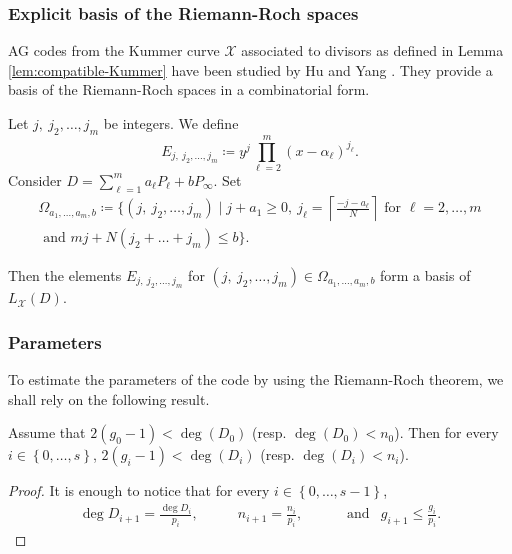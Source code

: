 \documentclass[10pt,a4paper]{article}
\newcommand\ceil[1]{\left\lceil #1 \right\rceil}
\newcommand{\set}[1]{\left\{#1\right\}}
\newcommand{\range}[1]{\set{0,\dots,#1-1}}
\newcommand{\Range}[2]{\set{#1,\dots,#2}}
\newcommand\calX{\mathcal{X}}
\newcommand\mydef{\coloneqq}
\theoremstyle{plain}
\theoremstyle{plain}
\theoremstyle{definition}
\theoremstyle{remark}
\theoremstyle{plain}
\begin{document}
\subsubsection{Explicit basis of the Riemann-Roch spaces}

AG codes from the Kummer curve $\calX$ associated to divisors as defined in Lemma \ref{lem:compatible-Kummer} have been studied by Hu and Yang \cite{HY18}. They provide a basis of the Riemann-Roch spaces in a combinatorial form.

\begin{theorem}[{\cite[Theorem~5]{HY18}}]
	Let $j, \: j_2, \dots, j_m$ be integers. We define
	\[E_{j, \: j_2, \dots, j_m}\mydef y^j \prod_{\ell=2}^m (x-\alpha_\ell)^{j_\ell}.\]
	Consider $D=\sum_{\ell =1}^m a_\ell P_\ell + bP_\infty$. Set
	\begin{align*}\Omega_{a_1,\dots,a_m,b}\mydef \biggl\{ (j, \: j_2, \dots, j_m) \mid j+a_1 \geq 0, \: j_\ell =\ceil{\frac{-j-a_\ell}{N}} \text{ for } \ell = 2,\dots,m   \\
		\text{ and }mj+N(j_2+\dots+j_m) \leq b \biggr\}.\end{align*}
	
	Then the elements $E_{j, \: j_2, \dots, j_m}$ for $(j, \: j_2, \dots, j_m) \in \Omega_{a_1,\dots,a_m,b}$ form a basis of $L_\calX(D)$.
\end{theorem}



\subsubsection{Parameters}

To estimate the parameters of the code by using the Riemann-Roch theorem, we shall rely on the following result. 

\begin{lemma}\label{lem:nice_deg}
	Assume that $2(g_0-1) < \deg(D_0)$  (resp. $\deg(D_0)< n_0$). Then for every $i \in \Range{0}{s}$, $2(g_i-1) < \deg(D_i)$ (resp. $\deg(D_i) < n_i$).
	
\end{lemma}

\begin{proof}
	It is enough to notice that for every $i \in \range{s}$, 
	\[ \begin{aligned}
		&\deg D_{i+1} = \frac{\deg{D_i}}{p_i},\qquad  & n_{i+1} = \frac{n_i}{p_i}, \qquad & \text{ and} & g_{i+1} \leq \frac{g_i}{p_i}.&
	\end{aligned}\]
\end{proof}
\end{document}
